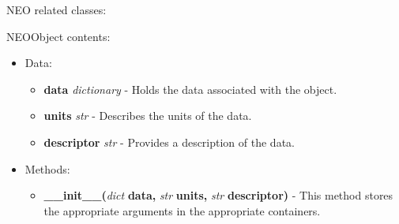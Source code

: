 \documentclass{article}
\begin{document}
\newpage

\noindent NEO related classes:

NEOObject contents:
\begin{itemize}
\item Data:
\begin{itemize}
\item \textbf{data} \emph{dictionary} - Holds the data associated with the object.
\item \textbf{units} \emph{str} - Describes the units of the data.
\item \textbf{descriptor} \emph{str} - Provides a description of the data.
\end{itemize}
\item Methods:
\begin{itemize}
\item \textbf{\_\_init\_\_(}\emph{dict}\textbf{ data,}\emph{ str}\textbf{ units,}\emph{ str}\textbf{ descriptor)} - This method stores the appropriate arguments in the appropriate containers.
\end{itemize}
\end{itemize}
\end{document}
